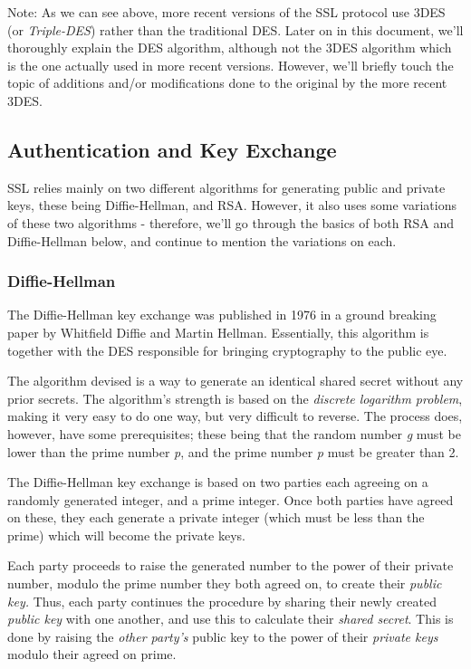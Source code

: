 Note: As we can see above, more recent versions of the SSL protocol use 3DES (or \textit{Triple-DES}) rather than the traditional DES. Later on in this document, we'll thoroughly explain the DES algorithm, although not the 3DES algorithm which is the one actually used in more recent versions. However, we'll briefly touch the topic of additions and/or modifications done to the original by the more recent 3DES.


\subsection{Authentication and Key Exchange}
SSL relies mainly on two different algorithms for generating public and private keys, these being Diffie-Hellman, and RSA. However, it also uses some variations of these two algorithms - therefore, we'll go through the basics of both RSA and Diffie-Hellman below, and continue to mention the variations on each.

\subsubsection[Diffie-Hellman]{Diffie-Hellman}
The Diffie-Hellman key exchange was published in 1976 in a ground breaking paper by Whitfield Diffie and Martin Hellman\cite{NewDirectionsInCryptography}. Essentially, this algorithm is together with the DES responsible for bringing cryptography to the public eye.

The algorithm devised is a way to generate an identical shared secret without any prior secrets. The algorithm's strength is based on the \textit{discrete logarithm problem}, making it very easy to do one way, but very difficult to reverse. The process does, however, have some prerequisites; these being that the random number \textit{g} must be lower than the prime number \textit{p}, and the prime number \textit{p} must be greater than 2.

The Diffie-Hellman key exchange is based on two parties each agreeing on a randomly generated integer, and a prime integer. Once both parties have agreed on these, they each generate a private integer (which must be less than the prime) which will become the private keys. 

Each party proceeds to raise the generated number to the power of their private number, modulo the prime number they both agreed on, to create their \textit{public key. }Thus, each party continues the procedure by sharing their newly created \textit{public key }with one another, and use this to calculate their \textit{shared secret}. This is done by raising the \textit{other party's }public key to the power of their \textit{private keys }modulo their agreed on prime.\cite{algorithmDiffieHellman}

